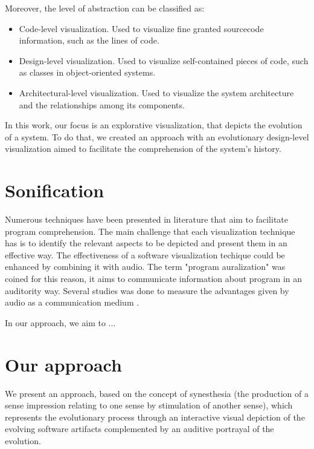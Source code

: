 Moreover, the level of abstraction can be classified as:
\begin{itemize}
	\item Code-level visualization. Used to visualize fine granted sourcecode information, such as the lines of code. 
	\item Design-level visualization. Used to visualize self-contained pieces of code, such as classes in object-oriented systems. 
	\item Architectural-level visualization. Used to visualize the system architecture and the relationships among its components. 
\end{itemize}


In this work, our focus is an explorative visualization, that depicts the evolution of a system. To do that, we created an approach with an evolutionary design-level visualization aimed to facilitate the comprehension of the system's history. 

\section{Sonification}
Numerous techniques have been presented in literature that aim to facilitate program comprehension. 
The main challenge that each visualization technique has is to identify the relevant aspects to be depicted and present them in an effective way. 
The effectiveness of a software visualization techique could be enhanced by combining it with audio. 
The term "program auralization" was coined for this reason, it aims to communicate information about program in an auditority way.
Several studies was done to measure the advantages given by audio as a communication medium \cite{Alty1995}. 

In our approach, we aim to ...

\section{Our approach}
We present an approach, based on the concept of synesthesia 
(the production of a sense impression relating to one sense by stimulation of another sense), 
which represents the evolutionary process through an interactive visual depiction 
of the evolving software artifacts complemented by an auditive portrayal of the evolution.

